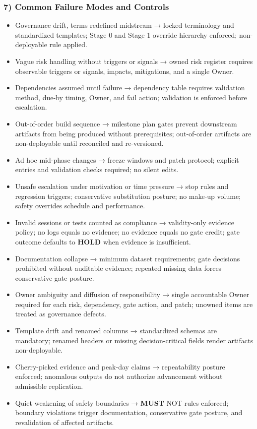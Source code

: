\documentclass[10pt]{article}
\begin{document}
\subsubsection*{7) Common Failure Modes and Controls}

\begin{itemize}
\item Governance drift, terms redefined midstream → locked terminology and standardized templates; Stage 0 and Stage 1 override hierarchy enforced; non-deployable rule applied.
\item Vague risk handling without triggers or signals → owned risk register requires observable triggers or signals, impacts, mitigations, and a single Owner.
\item Dependencies assumed until failure → dependency table requires validation method, due-by timing, Owner, and fail action; validation is enforced before escalation.
\item Out-of-order build sequence → milestone plan gates prevent downstream artifacts from being produced without prerequisites; out-of-order artifacts are non-deployable until reconciled and re-versioned.
\item Ad hoc mid-phase changes → freeze windows and patch protocol; explicit entries and validation checks required; no silent edits.
\item Unsafe escalation under motivation or time pressure → stop rules and regression triggers; conservative substitution posture; no make-up volume; safety overrides schedule and performance.
\item Invalid sessions or tests counted as compliance → validity-only evidence policy; no logs equals no evidence; no evidence equals no gate credit; gate outcome defaults to \textbf{HOLD} when evidence is insufficient.
\item Documentation collapse → minimum dataset requirements; gate decisions prohibited without auditable evidence; repeated missing data forces conservative gate posture.
\item Owner ambiguity and diffusion of responsibility → single accountable Owner required for each risk, dependency, gate action, and patch; unowned items are treated as governance defects.
\item Template drift and renamed columns → standardized schemas are mandatory; renamed headers or missing decision-critical fields render artifacts non-deployable.
\item Cherry-picked evidence and peak-day claims → repeatability posture enforced; anomalous outputs do not authorize advancement without admissible replication.
\item Quiet weakening of safety boundaries → \textbf{MUST} NOT rules enforced; boundary violations trigger documentation, conservative gate posture, and revalidation of affected artifacts.
\end{itemize}
\end{document}
